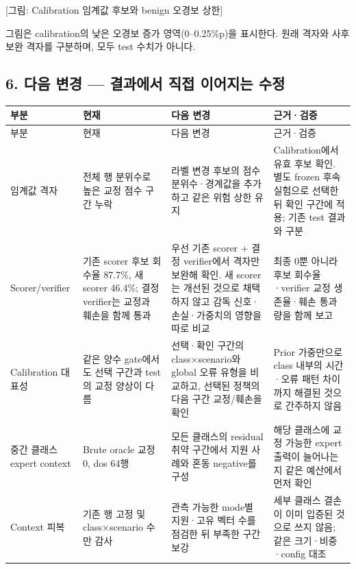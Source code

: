 [그림: Calibration 임계값 후보와 benign 오경보 상한]

그림은 calibration의 낮은 오경보 증가 영역(0–0.25\%p)을 표시한다. 원래 격자와 사후 보완 격자를 구분하며, 모두 test 수치가 아니다.

\subsection{6. 다음 변경 — 결과에서 직접 이어지는 수정}
\begingroup
\footnotesize
\begin{longtable}{>{\raggedright\arraybackslash}p{}>{\raggedright\arraybackslash}p{}>{\raggedright\arraybackslash}p{}>{\raggedright\arraybackslash}p{}}
\toprule
부분 & 현재 & 다음 변경 & 근거·검증 \\ \midrule
\endfirsthead
부분 & 현재 & 다음 변경 & 근거·검증 \\ \midrule
\endhead
{}임계값 격자 & 전체 행 분위수로 높은 교정 점수 구간 누락 & 라벨 변경 후보의 점수 분위수·경계값을 추가하고 같은 위험 상한 유지 & Calibration에서 유효 후보 확인. 별도 frozen 후속 실험으로 선택한 뒤 확인 구간에 적용; 기존 test 결과와 구분 \\
{}Scorer/\allowbreak{}verifier & 기존 scorer 후보 회수율 87.7\%, 새 scorer 46.4\%; 결정 verifier는 교정과 훼손을 함께 통과 & 우선 기존 scorer +\allowbreak{} 결정 verifier에서 격자만 보완해 확인. 새 scorer는 개선된 것으로 채택하지 않고 감독 신호·손실·가중치의 영향을 따로 비교 & 최종 0뿐 아니라 후보 회수율·verifier 교정 생존율·훼손 통과량을 함께 보고 \\
{}Calibration 대표성 & 같은 양수 gate에서도 선택 구간과 test의 교정 양상이 다름 & 선택·확인 구간의 class×scenario와 global 오류 유형을 비교하고, 선택된 정책의 다음 구간 교정/\allowbreak{}훼손을 확인 & Prior 가중만으로 class 내부의 시간·오류 패턴 차이까지 해결된 것으로 간주하지 않음 \\
{}중간 클래스 expert context & Brute oracle 교정 0, dos 64행 & 모든 클래스의 residual 취약 구간에서 지원 사례와 혼동 negative를 구성 & 해당 클래스에 교정 가능한 expert 출력이 늘어나는지 같은 예산에서 먼저 확인 \\
{}Context 피복 & 기존 행 고정 및 class×scenario 수만 감사 & 관측 가능한 mode별 지원·고유 벡터 수를 점검한 뒤 부족한 구간 보강 & 세부 클래스 결손이 이미 입증된 것으로 쓰지 않음; 같은 크기·비중·config 대조 \\
\bottomrule
\end{longtable}
\endgroup
